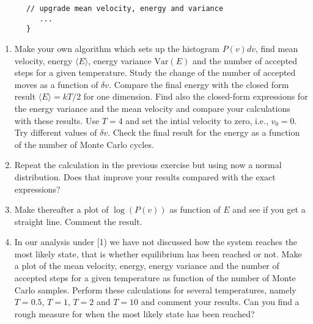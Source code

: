 \begin{prob}
\begin{lstlisting}
      // upgrade mean velocity, energy and variance
         ...
      }
\end{lstlisting}


\begin{enumerate}
\item  Make your own algorithm which sets up the histogram
$P(v)dv$, find mean velocity, energy $\langle E\rangle$, energy variance $\mathrm{Var}(E)$ 
and the number of
accepted steps for a given temperature. Study the change of the number of
accepted moves as a function of $\delta v$.
Compare the final energy with the closed form result
$\langle E\rangle=kT/2$ for one dimension. Find also the closed-form expressions for the energy variance  and the mean velocity and compare your calculations with these results. 
Use $T=4$ and set the intial velocity to zero, i.e., $v_0=0$. 
Try different values of $\delta v$.
Check the final result for the energy as a function 
of the number of Monte Carlo cycles.

\item   Repeat the calculation in the previous exercise but using now a normal distribution. Does that improve your results compared with the exact expressions?

\item  Make thereafter a plot of  $\log{(P(v))}$ as function of $E$
and see if you get a straight line. Comment the result.

\item  In our analysis under [1) we have not discussed how the system reaches the most likely state, that is whether equilibrium has been reached or not.
Make a plot of the mean velocity, energy, energy variance and the number of
accepted steps for a given temperature as function of the number of
Monte Carlo samples. Perform these calculations for several temperatures, namely $T=0.5$, $T=1$, $T=2$ and $T=10$ and comment your results. Can you find
a rough measure for when the most likely state has been reached?


\end{enumerate}
\end{prob}
